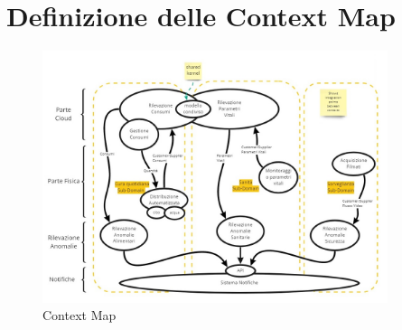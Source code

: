     \section{Definizione delle Context Map}
    \begin{figure}[ht]
        \caption{Context Map}
        \centering
        \includegraphics[width=0.9\textwidth]{Miro/ContextMap.jpg}
    \end{figure}
    